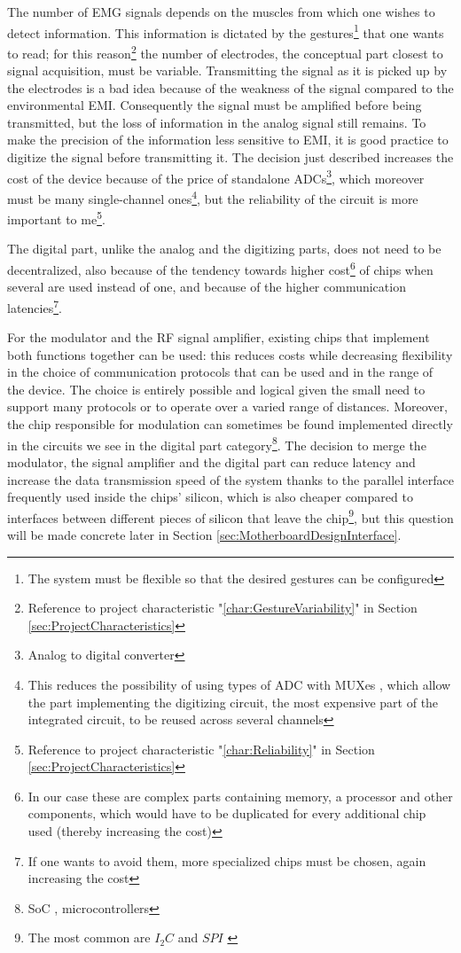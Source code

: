 \documentclass[a4paper, 10pt, final]{article} %
\newcommand{\parenciteit}[2]{\textit{\parencite[#1]{#2}}} %
\begin{document}
    The number of EMG signals depends on the muscles from which one wishes to detect information.
    This information is dictated by the gestures\footnote{The system must be flexible so that the desired gestures can be configured} that one wants to read; for this reason\footnote{Reference to project characteristic "\ref{char:GestureVariability}" in Section \ref{sec:ProjectCharacteristics}} the number of electrodes, the conceptual part closest to signal acquisition, must be variable.
    Transmitting the signal as it is picked up by the electrodes is a bad idea because of the weakness of the signal compared to the environmental EMI.
    Consequently the signal must be amplified before being transmitted, but the loss of information in the analog signal still remains.
    To make the precision of the information less sensitive to EMI, it is good practice to digitize the signal before transmitting it.
    The decision just described increases the cost of the device because of the price of standalone ADCs\footnote{Analog to digital converter}, which moreover must be many single-channel ones\footnote{This reduces the possibility of using types of ADC with MUXes \parenciteit{}{Multiplexer:Wiki}, which allow the part implementing the digitizing circuit, the most expensive part of the integrated circuit, to be reused across several channels}, but the reliability of the circuit is more important to me\footnote{Reference to project characteristic "\ref{char:Reliability}" in Section \ref{sec:ProjectCharacteristics}}.

    The digital part, unlike the analog and the digitizing parts, does not need to be decentralized, also because of the tendency towards higher cost\footnote{In our case these are complex parts containing memory, a processor and other components, which would have to be duplicated for every additional chip used (thereby increasing the cost)} of chips when several are used instead of one, and because of the higher communication latencies\footnote{If one wants to avoid them, more specialized chips must be chosen, again increasing the cost}.

    For the modulator and the RF signal amplifier, existing chips that implement both functions together can be used: this reduces costs while decreasing flexibility in the choice of communication protocols that can be used and in the range of the device.
    The choice is entirely possible and logical given the small need to support many protocols or to operate over a varied range of distances.
    Moreover, the chip responsible for modulation can sometimes be found implemented directly in the circuits we see in the digital part category\footnote{SoC \parenciteit{}{SoC:Wiki}, microcontrollers}.
    The decision to merge the modulator, the signal amplifier and the digital part can reduce latency and increase the data transmission speed of the system thanks to the parallel interface frequently used inside the chips' silicon, which is also cheaper compared to interfaces between different pieces of silicon that leave the chip\footnote{The most common are $I_2 C$ \parenciteit{}{I2C:Wiki} and $SPI$ \parenciteit{}{SPI:Wiki}}, but this question will be made concrete later in Section \ref{sec:MotherboardDesignInterface}.
\end{document}
